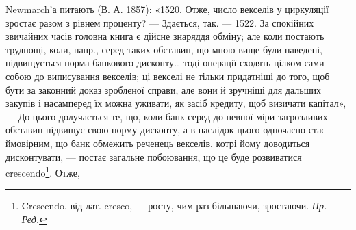 Newmarch’а питають (В. А. 1857): «1520. Отже, число векселів у циркуляції
зростає разом з рівнем проценту? — Здається, так. — 1522. За спокійних
звичайних часів головна книга є дійсне знаряддя обміну; але коли постають
труднощі, коли, напр., серед таких обставин, що мною вище були наведені, підвищується
норма банкового дисконту\dots{} тоді операції сходять цілком сами собою
до виписування векселів; ці векселі не тільки придатніші до того, щоб бути за
законний доказ зробленої справи, але вони й зручніші для дальших закупів
і насамперед їх можна уживати, як засіб кредиту, щоб визичати капітал», —
До цього долучається те, що, коли банк серед до певної міри загрозливих обставин
підвищує свою норму дисконту, а в наслідок цього одночасно стає ймовірним,
що банк обмежить реченець векселів, котрі йому доводиться дисконтувати,
— постає загальне побоювання, що це буде розвиватися crescendo\footnote{
Crescendo. від лат. cresco, — росту, чим раз більшаючи, зростаючи. \emph{Пр. Ред.}
}. Отже,
\parbreak{}  %
